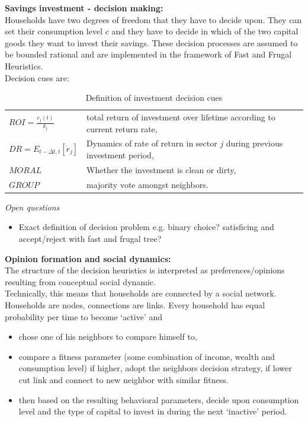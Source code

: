 \textbf{Savings investment - decision making:} \\
Households have two degrees of freedom that they have to decide upon. They can set their consumption level $c$ and they have to decide in which of the two capital goods they want to invest their savings. These decision processes are assumed to be bounded rational and are implemented in the framework of Fast and Frugal Heuristics.\\
Decision cues are:
\begin{table}[H]
	\centering
	\begin{tabular}{ll}
		$ROI = \frac{r_j(t)}{\delta_j}$ & total return of investment over lifetime according to current return rate,\\
		$DR = E_{t-\Delta t, t}[\dot{r}_j]$ & Dynamics of rate of return in sector $j$ during previous investment period, \\
		$MORAL$ & Whether the investment is clean or dirty, \\
		$GROUP$ & majority vote amongst neighbors. \\
	\end{tabular}
	\caption{Definition of investment decision cues}
	\label{tab:decision_cues}
\end{table}

\textit{Open questions}
\begin{itemize}
	\item Exact definition of decision problem e.g. binary choice? satisficing and accept/reject with fast and frugal tree?
\end{itemize}

\textbf{Opinion formation and social dynamics:} \\
The structure of the decision heuristics is interpreted as preferences/opinions resulting from conceptual social dynamic. \\
Technically, this means that households are connected by a social network. Households are nodes, connections are links. Every household has equal probability per time to become `active' and
\begin{itemize}
	\item chose one of his neighbors to compare himself to,
	\item compare a fitness parameter (some combination of income, wealth and consumption level) if higher, adopt the neighbors decision strategy, if lower cut link and connect to new neighbor with similar fitness.
	\item then based on the resulting behavioral parameters, decide upon consumption level and the type of capital to invest in during the next `inactive' period.
\end{itemize}

